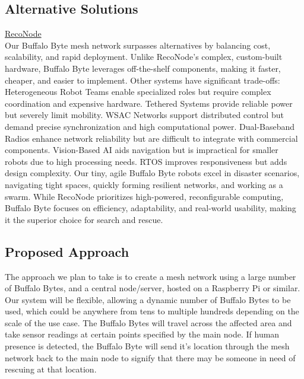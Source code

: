 \documentclass[10pt]{article}
\begin{document}
\subsection*{Alternative Solutions}
\underline{RecoNode}\\[0.5\baselineskip]
Our Buffalo Byte mesh network surpasses alternatives by balancing cost, scalability, and rapid deployment. Unlike RecoNode’s complex, custom-built hardware, Buffalo Byte leverages off-the-shelf components, making it faster, cheaper, and easier to implement. Other systems have significant trade-offs: Heterogeneous Robot Teams enable specialized roles but require complex coordination and expensive hardware. Tethered Systems provide reliable power but severely limit mobility. WSAC Networks support distributed control but demand precise synchronization and high computational power. Dual-Baseband Radios enhance network reliability but are difficult to integrate with commercial components. Vision-Based AI aids navigation but is impractical for smaller robots due to high processing needs. RTOS improves responsiveness but adds design complexity. Our tiny, agile Buffalo Byte robots excel in disaster scenarios, navigating tight spaces, quickly forming resilient networks, and working as a swarm. While RecoNode prioritizes high-powered, reconfigurable computing, Buffalo Byte focuses on efficiency, adaptability, and real-world usability, making it the superior choice for search and rescue.
\subsection*{Proposed Approach}
The approach we plan to take is to create a mesh network using a large number of Buffalo Bytes, and a central node/server, hosted on a Raspberry Pi or similar. Our system will be flexible, allowing a dynamic number of Buffalo Bytes to be used, which could be anywhere from tens to multiple hundreds depending on the scale of the use case. The Buffalo Bytes will travel across the affected area and take sensor readings at certain points specified by the main node. If human presence is detected, the Buffalo Byte will send it's location through the mesh network back to the main node to signify that there may be someone in need of rescuing at that location.
\end{document}
